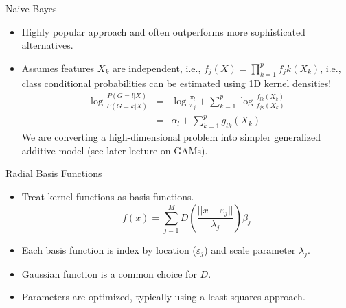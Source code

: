 \documentclass{beamer}
\begin{document}
\begin{frame}{Naive Bayes}
    \begin{itemize}
        \item Highly popular approach and often outperforms more sophisticated alternatives.
        \item Assumes features $X_k$ are independent, i.e., $f_j(X) = \prod_{k=1}^p f_jk(X_k)$, i.e., class conditional probabilities can be estimated using 1D kernel densities!
        \begin{eqnarray*}
        \log{\frac{P(G=l|X)}{P(G=k|X)}} & = & \log{\frac{\pi_l}{\pi_j}} + \sum_{k=1}^p \log{\frac{f_{lk}(X_k)}{f_{jk}(X_k)}}\\
        & = & \alpha_l + \sum_{k=1}^p g_{lk}(X_k)
        \end{eqnarray*}
        We are converting a high-dimensional problem into simpler generalized additive model (see later lecture on GAMs). 
    \end{itemize}
\end{frame}


\begin{frame}{Radial Basis Functions}
    \begin{itemize}
        \item Treat kernel functions as basis functions.
        \begin{equation*}
            f(x) = \sum_{j=1}^M D(\frac{||x-\varepsilon_j||}{\lambda_j})\beta_j
        \end{equation*}
        \item Each basis function is index by location ($\varepsilon_j$) and scale parameter $\lambda_j$.
        \item Gaussian function is a common choice for $D$.
        \item Parameters are optimized, typically using a least squares approach.
    \end{itemize}
\end{frame}
\end{document}
